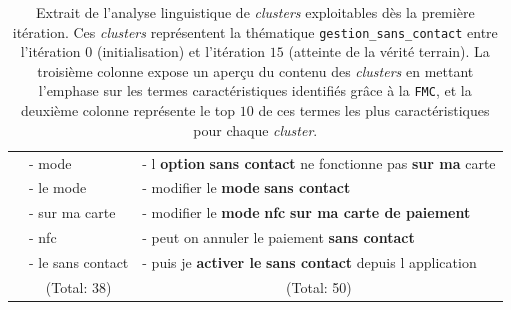 \begin{table}[!htb]
\begin{center}
\begin{tabular}{|c|l|l|}
						& { \scriptsize - mode }
						& { \scriptsize - l \textbf{option} \textbf{sans contact} ne fonctionne pas \textbf{sur ma} carte }
						\tabularnewline
						
						& { \scriptsize - le mode }
						& { \scriptsize - modifier le \textbf{mode} \textbf{sans contact} }
						\tabularnewline
						
						& { \scriptsize - sur ma carte }
						& { \scriptsize - modifier le \textbf{mode} \textbf{nfc} \textbf{sur ma carte de paiement} }
						\tabularnewline
						
						& { \scriptsize - nfc }
						& { \scriptsize - peut on annuler le paiement \textbf{sans contact} }
						\tabularnewline
						
						& { \scriptsize - le sans contact }
						& { \scriptsize - puis je \textbf{activer le} \textbf{sans contact} depuis l application }
						\tabularnewline
						
						& \multicolumn{1}{c|}{
							\scriptsize (Total: 38)
						}
						& \multicolumn{1}{c|}{
							\scriptsize (Total: 50)
						}
						\tabularnewline
						\hline
					
				\end{tabular}
				\end{center}
				\caption{
					Extrait de l'analyse linguistique de \textit{clusters} exploitables dès la première itération.
					Ces \textit{clusters} représentent la thématique \texttt{gestion\_sans\_contact} entre l'itération $0$ (initialisation) et l'itération $15$ (atteinte de la vérité terrain).
					La troisième colonne expose un aperçu du contenu des \textit{clusters} en mettant l'emphase sur les termes caractéristiques identifiés grâce à la \texttt{FMC}, et la deuxième colonne représente le top $10$ de ces termes les plus caractéristiques pour chaque \textit{cluster}.
				}
				\label{table:4.4.2-ETUDE-PERTINENCE-PATTERNS-LINGUISTIQUES-GESTION-SANS-CONTACT}
			\end{table}
			
